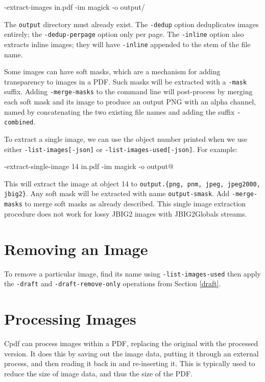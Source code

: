 \documentclass{book}
\begin{document}
  \begin{framed}
  \noindent\small\verb@cpdf -extract-images in.pdf -im magick -o output/%%%@
  \end{framed}

\noindent The \texttt{output} directory must already exist. The \texttt{-dedup} option deduplicates images entirely; the \texttt{-dedup-perpage} option only per page. The \texttt{-inline} option also extracts inline images; they will have \texttt{-inline} appended to the stem of the file name.

Some images can have soft masks, which are a mechanism for adding transparency to images in a PDF. Such masks will be extracted with a \texttt{-mask} suffix. Adding \texttt{-merge-masks} to the command line will post-process by merging each soft mask and its image to produce an output PNG with an alpha channel, named by concatenating the two existing file names and adding the suffix \texttt{-combined}.

To extract a single image, we can use the object number printed when we use either \texttt{-list-images[-json]} or \texttt{-list-images-used[-json]}. For example:

  \begin{framed}
  \noindent\small\verb@cpdf -extract-single-image 14 in.pdf -im magick -o output@
  \end{framed}

\noindent This will extract the image at object 14 to \texttt{output.\{png, pnm, jpeg, jpeg2000, jbig2\}}. Any soft mask will be extracted with name \texttt{output-smask}. Add \texttt{-merge-masks} to merge soft masks as already described. This single image extraction procedure does not work for lossy JBIG2 images with JBIG2Globals streams.

\section{Removing an Image}

To remove a particular image, find its name using \texttt{-list-images-used} then apply the \texttt{-draft} and \texttt{-draft-remove-only} operations from Section \ref{draft}. 

\section{Processing Images}

Cpdf can process images within a PDF, replacing the original with the processed version. It does this by saving out the image data, putting it through an external process, and then reading it back in and re-inserting it. This is typically used to reduce the size of image data, and thus the size of the PDF.
\end{document}
